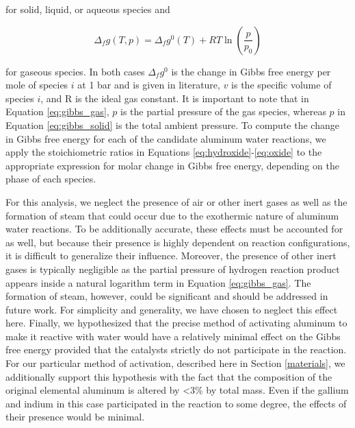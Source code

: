 \documentclass[preprint,12pt,3p]{elsarticle}
\begin{document}
\noindent for solid, liquid, or aqueous species and

\begin{equation}
  \Delta_f g(T,p) = \Delta_f g^{0}(T) + RT\ln\left(\frac{p}{p_0}\right) 
  \label{eq:gibbs_gas}
\end{equation}

\noindent for gaseous species. In both cases $\Delta_f g^0$ is the change in
Gibbs free energy per mole of species $i$ at 1 bar and is given in literature,
$v$ is the specific volume of species $i$, and R is the ideal gas constant. It
is important to note that in Equation \ref{eq:gibbs_gas}, $p$ is the partial
pressure of the gas species, whereas $p$ in Equation \ref{eq:gibbs_solid} is the
total ambient pressure. To compute the change in Gibbs free energy for each of
the candidate aluminum water reactions, we apply the stoichiometric ratios in
Equations \ref{eq:hydroxide}-\ref{eq:oxide} to the appropriate expression for
molar change in Gibbs free energy, depending on the phase of each species.

For this analysis, we neglect the presence of air or other inert gases as well
as the formation of steam that could occur due to the exothermic nature of
aluminum water reactions. To be additionally accurate, these effects must be
accounted for as well, but because their presence is highly dependent on
reaction configurations, it is difficult to generalize their influence.
Moreover, the presence of other inert gases is typically negligible as the
partial pressure of hydrogen reaction product appears inside a natural logarithm
term in Equation \ref{eq:gibbs_gas}. The formation of steam, however, could be
significant and should be addressed in future work. For simplicity and
generality, we have chosen to neglect this effect here. Finally, we hypothesized
that the precise method of activating aluminum to make it reactive with water
would have a relatively minimal effect on the Gibbs free energy provided that
the catalysts strictly do not participate in the reaction. For our particular
method of activation, described here in Section \ref{materials}, we additionally
support this hypothesis with the fact that the composition of the original
elemental aluminum is altered by \textless3\% by total mass. Even if the gallium
and indium in this case participated in the reaction to some degree, the effects
of their presence would be minimal.
\end{document}
